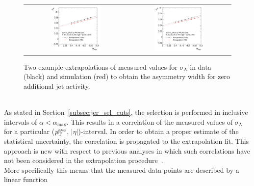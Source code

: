 \begin{figure}[!tp]
  \centering
  \begin{tabular}{cc}
                \includegraphics[width=0.49\textwidth]{figures/Extrapol_Eta0_pt4_final_nominal_v4.pdf} &
                \includegraphics[width=0.49\textwidth]{figures/Extrapol_Eta0_pt9_final_nominal_v4.pdf}
  \end{tabular}
  \caption{Two example extrapolations of measured values for $\sigma_\mathrm{A}$ in data (black) and simulation (red) to obtain the asymmetry width for zero additional jet activity.}
  \label{fig:extrapol}
\end{figure}
\\
As stated in Section~\ref{subsec:jer_sel_cuts}, the selection is performed in inclusive intervals of $\alpha < \alpha_\mathrm{max}$. This results in a correlation of the measured values of $\sigma_\mathrm{A}$ for a particular ($p_{\text{T}}^\mathrm{ave}$, $|\eta|$)-interval. In order to obtain a proper estimate of the statistical uncertainty, the correlation is propagated to the extrapolation fit. This approach is new with respect to previous analyses in which such correlations have not been considered in the extrapolation procedure~\cite{1748-0221-6-11-P11002, thesis:Schroeder, Aad:2012ag}. \\
More specifically this means that the measured data points are described by a linear function 
